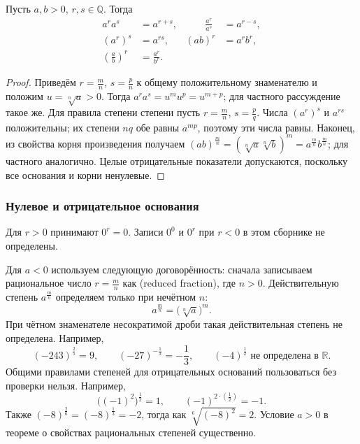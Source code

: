 \begin{theorem}
Пусть \(a,b>0\), \(r,s\in\mathbb Q\). Тогда
\[
\begin{aligned}
a^r a^s&=a^{r+s},&\qquad \frac{a^r}{a^s}&=a^{r-s},\\
(a^r)^s&=a^{rs},&(ab)^r&=a^rb^r,\\
\left(\frac ab\right)^r&=\frac{a^r}{b^r}.
\end{aligned}
\]
\end{theorem}
\begin{proof}
Приведём \(r=\frac mn\), \(s=\frac pn\) к общему положительному знаменателю и положим \(u=\sqrt[n]a>0\). Тогда \(a^ra^s=u^mu^p=u^{m+p}\); для частного рассуждение такое же. Для правила степени степени пусть \(r=\frac mn\), \(s=\frac pq\). Числа \((a^r)^s\) и \(a^{rs}\) положительны; их степени \(nq\) обе равны \(a^{mp}\), поэтому эти числа равны. Наконец, из свойства корня произведения получаем \((ab)^{\frac mn}=(\sqrt[n]a\sqrt[n]b)^m=a^{\frac mn}b^{\frac mn}\); для частного аналогично. Целые отрицательные показатели допускаются, поскольку все основания и корни ненулевые.
\end{proof}

\subsubsection*{Нулевое и отрицательное основания}
Для \(r>0\) принимают \(0^r=0\). Записи \(0^0\) и \(0^r\) при \(r<0\) в этом сборнике не определены.

Для \(a<0\) используем следующую договорённость: сначала записываем рациональное число \(r=\frac mn\) как  (reduced fraction), где \(n>0\). Действительную степень \(a^{\frac mn}\) определяем только при нечётном \(n\):
\[
a^{\frac mn}=\bigl(\sqrt[n]a\bigr)^m.
\]
При чётном знаменателе несократимой дроби такая действительная степень не определена. Например,
\[
(-243)^{\frac25}=9,\qquad
(-27)^{-\frac13}=-\frac13,\qquad
(-4)^{\frac12}\text{ не определена в }\mathbb R.
\]
Общими правилами степеней для отрицательных оснований пользоваться без проверки нельзя. Например,
\[
\bigl((-1)^2\bigr)^{\frac12}=1,
\qquad
(-1)^{2\cdot(\frac12)}=-1.
\]
Также \((-8)^{\frac26}=(-8)^{\frac13}=-2\), тогда как \(\sqrt[6]{(-8)^2}=2\). Условие \(a>0\) в теореме о свойствах рациональных степеней существенно.
